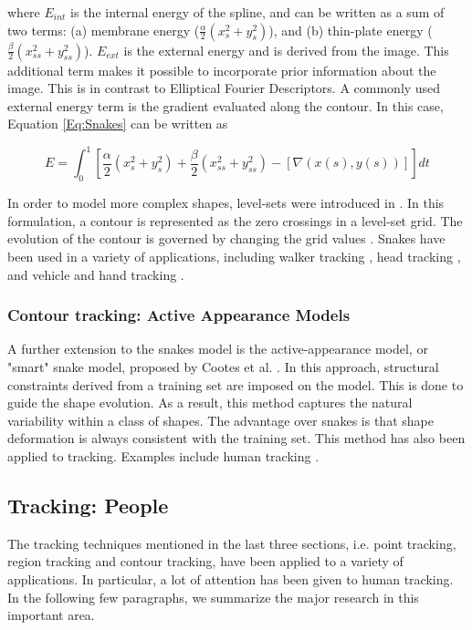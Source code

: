 \documentclass[12pt,letterpaper,doublespaced,ETD,proposal]{gt-ece-thesis}
\begin{document}
\begin{Body}
where $E_{int}$ is the internal energy of the spline, and can be written as a sum of two terms: (a) membrane energy ($\frac{\alpha}{2}(x_s^2 + y_s^2)$), and (b) thin-plate energy ($\frac{\beta}{2}(x_{ss}^2 + y_{ss}^2)$).  $E_{ext}$ is the external energy and is derived from the image.  This additional term makes it possible to incorporate prior information about the image.  This is in contrast to Elliptical Fourier Descriptors.  A commonly used external energy term is the gradient evaluated along the contour.  In this case, Equation \ref{Eq:Snakes} can be written as

\begin{equation}
	\label{eq:SnakesEnergy1}
	E=\int_0^1 \left[\frac{\alpha}{2}(x_s^2 + y_s^2) + \frac{\beta}{2}(x_{ss}^2 + y_{ss}^2) - \left[\nabla{(x(s), y(s))}\right]\right]dt
\end{equation}

In order to model more complex shapes, level-sets were introduced in \cite{1995_JNL_LevelSets_Malladi}.  In this formulation, a contour is represented as the zero crossings in a level-set grid.  The evolution of the contour is governed by changing the grid values \cite{2006_JNL_SURVEYtrk_Yilmaz}.  Snakes have been used in a variety of applications, including walker tracking \cite{1994_CNF_WalkingFiguresXYT_Niyogi}, head tracking \cite{2001_JNL_ProbabilisticDataAssociation_Rasmussen}, and vehicle and hand tracking \cite{1999_JNL_KalmanSnakes_Peterfreund}.

\subsubsection{Contour tracking: Active Appearance Models}
A further extension to the snakes model is the active-appearance model, or "smart" snake model, proposed by Cootes et al. \cite{1995_JNL_ActiveModels_Cootes}.  In this approach, structural constraints derived from a training set are imposed on the model.  This is done to guide the shape evolution.  As a result, this method captures the natural variability within a class of shapes.  The advantage over snakes is that shape deformation is always consistent with the training set.  This method has also been applied to tracking.  Examples include human tracking \cite{1994_CNF_ContourTracking_BaumbergHogg, 2003_JNL_ActiveShapeTracking_Koschan}.


\subsection{Tracking: People}
The tracking techniques mentioned in the last three sections, i.e. point tracking, region tracking and contour tracking, have been applied to a variety of applications.  In particular, a lot of attention has been given to human tracking.  In the following few paragraphs, we summarize the major research in this important area.


\end{Body}
\end{document}
